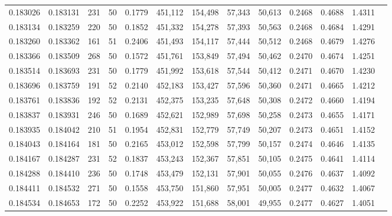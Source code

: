 \begin{tabular}{rrrrrrrrrrrrr}
0.183026 & 0.183131 &   231 &  50 &                                     0.1779 & 451,112 & 154,498 &  57,343 &  50,613 & 0.2468 & 0.4688 & 1.4311 \\
0.183134 & 0.183259 &   220 &  50 &                                     0.1852 & 451,332 & 154,278 &  57,393 &  50,563 & 0.2468 & 0.4684 & 1.4291 \\
0.183260 & 0.183362 &   161 &  51 &                                     0.2406 & 451,493 & 154,117 &  57,444 &  50,512 & 0.2468 & 0.4679 & 1.4276 \\
0.183366 & 0.183509 &   268 &  50 &                                     0.1572 & 451,761 & 153,849 &  57,494 &  50,462 & 0.2470 & 0.4674 & 1.4251 \\
0.183514 & 0.183693 &   231 &  50 &                                     0.1779 & 451,992 & 153,618 &  57,544 &  50,412 & 0.2471 & 0.4670 & 1.4230 \\
0.183696 & 0.183759 &   191 &  52 &                                     0.2140 & 452,183 & 153,427 &  57,596 &  50,360 & 0.2471 & 0.4665 & 1.4212 \\
0.183761 & 0.183836 &   192 &  52 &                                     0.2131 & 452,375 & 153,235 &  57,648 &  50,308 & 0.2472 & 0.4660 & 1.4194 \\
0.183837 & 0.183931 &   246 &  50 &                                     0.1689 & 452,621 & 152,989 &  57,698 &  50,258 & 0.2473 & 0.4655 & 1.4171 \\
0.183935 & 0.184042 &   210 &  51 &                                     0.1954 & 452,831 & 152,779 &  57,749 &  50,207 & 0.2473 & 0.4651 & 1.4152 \\
0.184043 & 0.184164 &   181 &  50 &                                     0.2165 & 453,012 & 152,598 &  57,799 &  50,157 & 0.2474 & 0.4646 & 1.4135 \\
0.184167 & 0.184287 &   231 &  52 &                                     0.1837 & 453,243 & 152,367 &  57,851 &  50,105 & 0.2475 & 0.4641 & 1.4114 \\
0.184288 & 0.184410 &   236 &  50 &                                     0.1748 & 453,479 & 152,131 &  57,901 &  50,055 & 0.2476 & 0.4637 & 1.4092 \\
0.184411 & 0.184532 &   271 &  50 &                                     0.1558 & 453,750 & 151,860 &  57,951 &  50,005 & 0.2477 & 0.4632 & 1.4067 \\
0.184534 & 0.184653 &   172 &  50 &                                     0.2252 & 453,922 & 151,688 &  58,001 &  49,955 & 0.2477 & 0.4627 & 1.4051 \\

\end{tabular}

